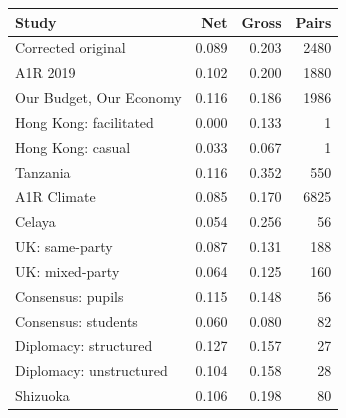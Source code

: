 
\begin{tabular}{lrrr}
\toprule
Study & Net & Gross & Pairs\\
\midrule
Corrected original & 0.089 & 0.203 & 2480\\
A1R 2019 & 0.102 & 0.200 & 1880\\
Our Budget, Our Economy & 0.116 & 0.186 & 1986\\
Hong Kong: facilitated & 0.000 & 0.133 & 1\\
Hong Kong: casual & 0.033 & 0.067 & 1\\
\addlinespace
Tanzania & 0.116 & 0.352 & 550\\
A1R Climate & 0.085 & 0.170 & 6825\\
Celaya & 0.054 & 0.256 & 56\\
UK: same-party & 0.087 & 0.131 & 188\\
UK: mixed-party & 0.064 & 0.125 & 160\\
\addlinespace
Consensus: pupils & 0.115 & 0.148 & 56\\
Consensus: students & 0.060 & 0.080 & 82\\
Diplomacy: structured & 0.127 & 0.157 & 27\\
Diplomacy: unstructured & 0.104 & 0.158 & 28\\
Shizuoka & 0.106 & 0.198 & 80\\
\bottomrule
\end{tabular}
